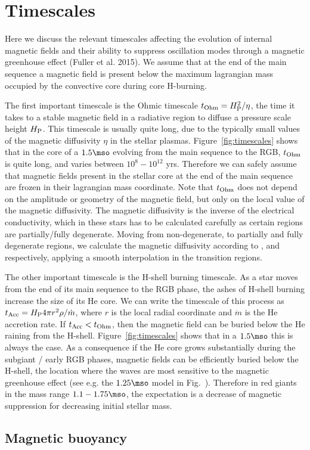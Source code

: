 \section{Timescales}
\label{time}
Here we discuss the relevant timescales affecting the evolution of internal magnetic fields and their ability to 
suppress oscillation modes through a magnetic greenhouse effect (Fuller et al. 2015).
We assume that at the end of the main sequence a magnetic field is present below the maximum lagrangian mass occupied by the convective core during core H-burning.

The first important timescale is the Ohmic timescale $t_{\rm Ohm}= H_{\rm P}^2/\eta$, the time it takes to a stable magnetic field in a radiative region to diffuse a pressure scale height $H_{\rm P}$. This timescale is usually quite long, due to the typically  small values of the magnetic diffusivity $\eta$ in the stellar plasmas. Figure~\ref{fig:timescales} shows that in the core of a $1.5\mso$ evolving from the main sequence to the RGB,  $t_{\rm Ohm}$ is quite long, and varies between $10^8-10^{12}$ yrs. Therefore we can safely assume that magnetic fields present in the stellar core at the end of the main sequence are frozen in their lagrangian mass coordinate.
Note that  $t_{\rm Ohm}$ does not depend on the amplitude or geometry of the magnetic field, but only on the local value of the magnetic diffusivity. The magnetic diffusivity is the inverse of the electrical conductivity,  which in these stars has to be calculated carefully as certain regions are partially/fully degenerate. Moving from non-degenerate, to partially and fully degenerate regions, we calculate the magnetic diffusivity according to ,  and  respectively, applying a smooth interpolation in the transition regions.

The other important timescale is the H-shell burning timescale. As a star moves from the end of its main sequence to the RGB phase, the ashes of H-shell burning increase the size of its He core. We can write the timescale of this process as $t_{\rm Acc} = H_{\rm P} 4\pi r^2 \rho / \dot{m}$, where $r$ is the local radial coordinate and $\dot{m}$ is the He accretion rate. If $t_{\rm Acc} < t_{\rm Ohm}$, then the magnetic field can be buried below the He raining from the H-shell. Figure~\ref{fig:timescales} shows that in a $1.5\mso$ this is always the case. As a consequence if the He core grows substantially during the subgiant / early RGB phases, magnetic fields can be efficiently buried below the H-shell, the location where the waves are most sensitive to the magnetic greenhouse effect (see e.g. the $1.25\mso$ model in Fig.~\label{fig:DipoleHist}). Therefore in red giants in the mass range $1.1-1.75\mso$, the expectation is a decrease of magnetic suppression for decreasing initial stellar mass.

\subsection{Magnetic buoyancy}